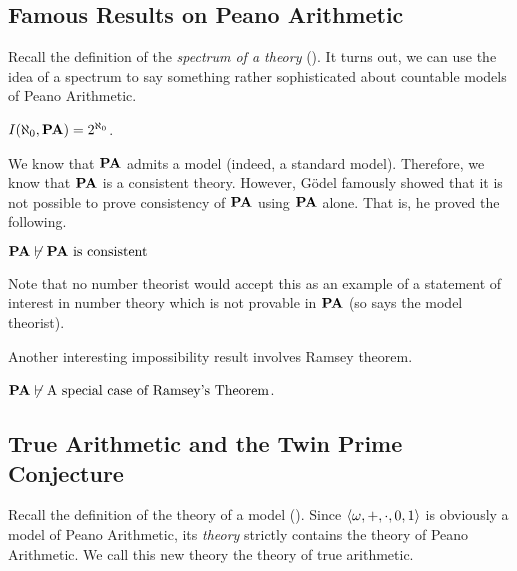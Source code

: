 

\subsection{Famous Results on Peano Arithmetic}

Recall the definition of the \textit{spectrum of a theory} (). It turns out, we can use the idea of a spectrum to say something rather sophisticated about countable models of Peano Arithmetic.

\begin{boxtheorem}\label{Ch1:Thm:Spectrum_of_PA}
    $I\!\left( \aleph_0, \mathbf{PA} \right) = 2^{\aleph_0}$.
\end{boxtheorem}

We know that $\mathbf{PA}$ admits a model (indeed, a standard model). Therefore, we know that $\mathbf{PA}$ is a consistent theory. However, Gödel famously showed that it is not possible to prove consistency of $\mathbf{PA}$ using $\mathbf{PA}$ alone. That is, he proved the following.

\begin{boxtheorem}
    $\mathbf{PA} \not\vdash \mathbf{PA} \text{ is consistent}$
\end{boxtheorem}
\begin{remark}
    Note that no number theorist would accept this as an example of a statement of interest in number theory which is not provable in $\mathbf{PA}$ (so says the model theorist). 
\end{remark}

Another interesting impossibility result involves Ramsey theorem.

\begin{boxtheorem}
    $\mathbf{PA} \not\vdash \text{A special case of Ramsey's Theorem}$.
\end{boxtheorem}

\subsection{True Arithmetic and the Twin Prime Conjecture}

Recall the definition of the theory of a model (). Since $\left\langle \omega, +, \cdot, 0, 1 \right\rangle$ is obviously a model of Peano Arithmetic, its \textit{theory} strictly contains the theory of Peano Arithmetic. We call this new theory the theory of true arithmetic.

